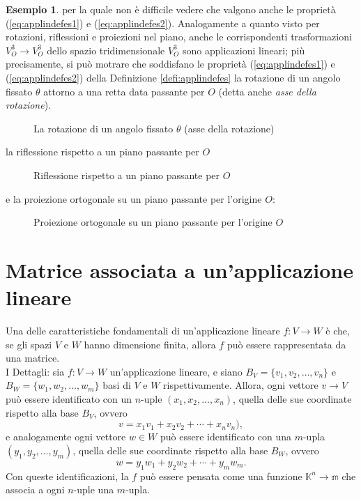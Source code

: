 \documentclass{book}
\theoremstyle{definition}
\newtheorem{es}{Esempio}[section]
\theoremstyle{plain}
\begin{document}
\begin{es}
  per la quale non è difficile vedere che valgono anche le proprietà
  (\ref{eq:applindefes1}) e (\ref{eq:applindefes2}).
  Analogamente a quanto visto per rotazioni, riflessioni e proiezioni nel
  piano, anche le corrispondenti trasformazioni $V_O^3\to V_O^3$ dello
  spazio tridimensionale $V_O^3$ sono applicazioni lineari; più
  precisamente, si può motrare che soddisfano le proprietà
  (\ref{eq:applindefes1}) e (\ref{eq:applindefes2}) della Definizione
  \ref{defi:applindefes} la rotazione di un angolo fissato $\theta$
  attorno a una retta data passante per $O$ (detta anche \emph{asse della
    rotazione}).
  \clearpage
  \begin{figure}[ht!]
    \centering
    \resizebox{3cm}{!}{}
    \caption{La rotazione di un angolo fissato $\theta$ (asse della rotazione)}
    \label{fig:applindefes8}
  \end{figure}
  la riflessione rispetto a un piano passante per $O$
  \begin{figure}[ht!]
    \centering
    \resizebox{4cm}{!}{}
    \caption{Riflessione rispetto a un piano passante per $O$}
    \label{fig:applindefes9}
  \end{figure}
  
  e la proiezione ortogonale su un piano passante per l'origine $O$:
  \begin{figure}[ht!]
    \centering
    \resizebox{5cm}{!}{}
    \caption{Proiezione ortogonale su un piano passante per l'origine $O$}
    \label{fig:applindefes10}
  \end{figure}
\end{es}

\section{Matrice associata a un'applicazione lineare}
\label{sec:mtxAsaplin}

Una delle caratteristiche fondamentali di un'applicazione lineare
$f:V\to W$ è che, se gli spazi $V$ e $W$ hanno dimensione finita, allora
$f$ può essere rappresentata da una matrice.\\
I Dettagli: sia $f:V\to W$ un'applicazione lineare, e siano
$B_V=\{v_1,v_2,\dots,v_n\}$ e $B_W=\{w_1,w_2,\dots,w_m\}$ basi di $V$ e
$W$ rispettivamente. Allora, ogni vettore $v\to V$ può essere identificato
con un $n$-uple $(x_1,x_2,\dots,x_n)$, quella delle sue coordinate
rispetto alla base $B_V$, ovvero
\begin{equation}
  \label{eq:mtxAsaplin1}
  v=x_1v_1+x_2v_2+\cdots+x_nv_n),
\end{equation}
e analogamente ogni vettore $w\in W$ può essere identificato con una
$m$-upla $(y_1,y_2,\dots,y_m)$, quella delle sue coordinate rispetto alla
base $B_W$, ovvero
\begin{equation}
  \label{eq:mtxAsaplin2}
  w=y_1w_1+y_2w_2+\cdots+y_mw_m.
\end{equation}
Con queste identificazioni, la $f$ può essere pensata come una funzione
$\mathds{K}^n\to\mathds{m}$ che associa a ogni $n$-uple una $m$-upla.
\end{document}
